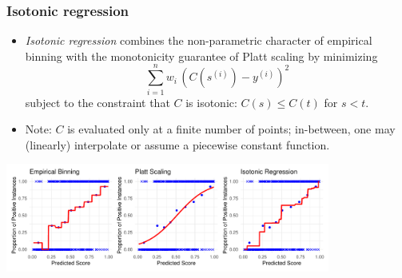 \documentclass[11pt,compress,t,notes=noshow, xcolor=table]{beamer}
\begin{document}
\begin{frame}[t]
	\frametitle{Isotonic regression %
}
    
	
	\begin{itemize}
		\item \emph{Isotonic regression} combines the non-parametric character of empirical binning with the monotonicity guarantee of Platt scaling by minimizing
		$$
		\sum_{i=1}^n w_i \, (C(s^{(i)}) - y^{(i)})^2 
		$$
		subject to the constraint that $C$ is isotonic: $C(s) \leq C(t)$ for $s <t$. 
		\item 
		Note: $C$ is evaluated only at a finite number of points; in-between, one may (linearly) interpolate or assume a piecewise constant function. 
		
	\end{itemize}
 \vfill\centering
\includegraphics[width=0.8\textwidth]{figure/calibration_methods3.pdf}
\end{frame}
\end{document}
